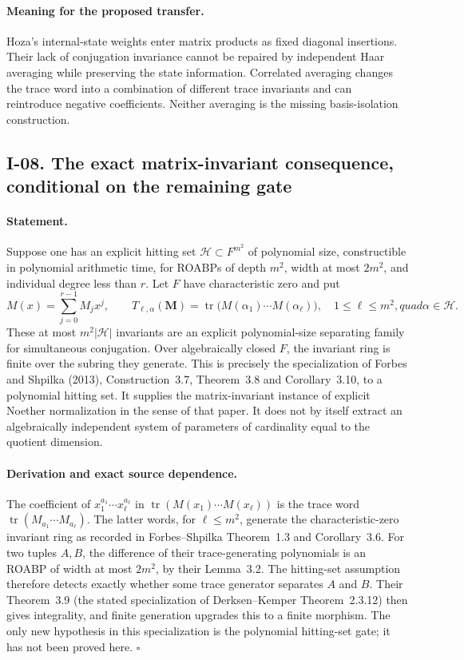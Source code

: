 \documentclass[11pt,a4paper]{article}
\theoremstyle{definition}\newtheorem{definition}{Definition}
\begin{document}
\paragraph{Meaning for the proposed transfer.}
Hoza's internal-state weights enter matrix products as fixed
diagonal insertions.  Their lack of conjugation invariance cannot
be repaired by independent Haar averaging while preserving the
state information.  Correlated averaging changes the trace word
into a combination of different trace invariants and can reintroduce
negative coefficients.  Neither averaging is the missing
basis-isolation construction.

\subsection{I-08. The exact matrix-invariant consequence, conditional on the remaining gate}
\label{I-08}

\paragraph{Statement.}
Suppose one has an explicit hitting set $\mathcal H\subset F^{m^2}$
of polynomial size, constructible in polynomial arithmetic time,
for ROABPs of depth $m^2$, width at most $2m^2$, and individual
degree less than $r$.  Let $F$ have characteristic zero and put
\[
 M(x)=\sum_{j=0}^{r-1}M_jx^j,\qquad
 T_{\ell,\alpha}(\mathbf M)=
 \operatorname{tr}\bigl(M(\alpha_1)\cdots M(\alpha_\ell)\bigr),
 \quad1\le\ell\le m^2,quad\alpha\in\mathcal H.
\tag{I.11}
\]
These at most $m^2|\mathcal H|$ invariants are an explicit
polynomial-size separating family for simultaneous conjugation.
Over algebraically closed $F$, the invariant ring is finite over
the subring they generate.  This is precisely the specialization
of Forbes and Shpilka (2013), Construction~3.7, Theorem~3.8 and
Corollary~3.10, to a polynomial hitting set.  It supplies the
matrix-invariant instance of explicit Noether normalization in
the sense of that paper.  It does not by itself extract an
algebraically independent system of parameters of cardinality
equal to the quotient dimension.

\paragraph{Derivation and exact source dependence.}
The coefficient of $x_1^{a_1}\cdots x_\ell^{a_\ell}$ in
$\operatorname{tr}(M(x_1)\cdots M(x_\ell))$ is the trace word
$\operatorname{tr}(M_{a_1}\cdots M_{a_\ell})$.  The latter words,
for $\ell\le m^2$, generate the characteristic-zero invariant ring
as recorded in Forbes--Shpilka Theorem~1.3 and Corollary~3.6.
For two tuples $A,B$, the difference of their trace-generating
polynomials is an ROABP of width at most $2m^2$, by their Lemma~3.2.
The hitting-set assumption therefore detects exactly whether
some trace generator separates $A$ and $B$.  Their Theorem~3.9
(the stated specialization of Derksen--Kemper Theorem~2.3.12)
then gives integrality, and finite generation upgrades this to
a finite morphism.  The only new hypothesis in this specialization
is the polynomial hitting-set gate; it has not been proved here.
\hfill$\square$
\end{document}
